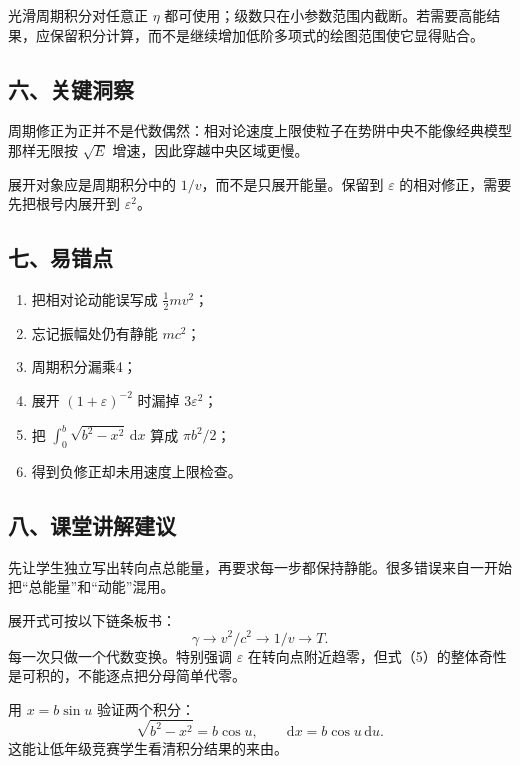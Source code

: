 \documentclass[12pt,a4paper,UTF8]{ctexart}
\newcommand{\tightlist}{\setlength{\itemsep}{0pt}\setlength{\parskip}{0pt}}
\begin{document}
光滑周期积分对任意正 \(\eta\)
都可使用；级数只在小参数范围内截断。若需要高能结果，应保留积分计算，而不是继续增加低阶多项式的绘图范围使它显得贴合。

\subsection{六、关键洞察}\label{ux516dux5173ux952eux6d1eux5bdf-6}

周期修正为正并不是代数偶然：相对论速度上限使粒子在势阱中央不能像经典模型那样无限按
\(\sqrt{E}\) 增速，因此穿越中央区域更慢。

展开对象应是周期积分中的 \(1/v\)，而不是只展开能量。保留到
\(\varepsilon\) 的相对修正，需要先把根号内展开到 \(\varepsilon^2\)。

\subsection{七、易错点}\label{ux4e03ux6613ux9519ux70b9-6}

\begin{enumerate}
\def\labelenumi{\arabic{enumi}.}
\tightlist
\item
  把相对论动能误写成 \(\frac12mv^2\)；
\item
  忘记振幅处仍有静能 \(mc^2\)；
\item
  周期积分漏乘4；
\item
  展开 \((1+\varepsilon)^{-2}\) 时漏掉 \(3\varepsilon^2\)；
\item
  把 \(\int_0^b\sqrt{b^2-x^2}\,\mathrm dx\) 算成 \(\pi b^2/2\)；
\item
  得到负修正却未用速度上限检查。
\end{enumerate}

\subsection{八、课堂讲解建议}\label{ux516bux8bfeux5802ux8bb2ux89e3ux5efaux8bae-6}

先让学生独立写出转向点总能量，再要求每一步都保持静能。很多错误来自一开始把``总能量''和``动能''混用。

展开式可按以下链条板书： \[
\gamma\rightarrow v^2/c^2
\rightarrow 1/v
\rightarrow T.
\] 每一次只做一个代数变换。特别强调 \(\varepsilon\)
在转向点附近趋零，但式（5）的整体奇性是可积的，不能逐点把分母简单代零。

用 \(x=b\sin u\) 验证两个积分： \[
\sqrt{b^2-x^2}=b\cos u,\qquad
\mathrm dx=b\cos u\,\mathrm du.
\] 这能让低年级竞赛学生看清积分结果的来由。
\end{document}
